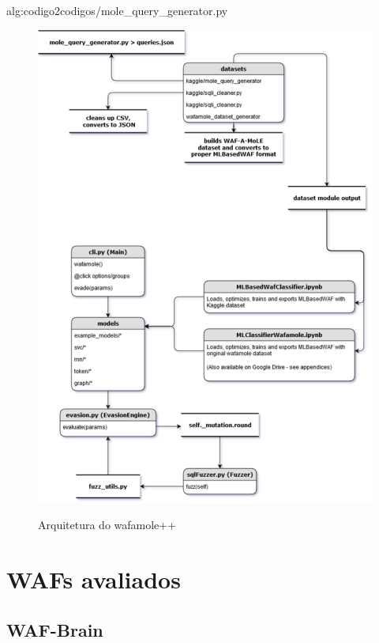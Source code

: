 \label{sec:codigos}
 {alg:codigo2}{codigos/mole_query_generator.py}
\bigskip

\begin{figure}[H]
    \centering
    \caption{Arquitetura do wafamole++}
    \includegraphics[width=16cm]{figuras/wafamole++_architecture.png} 
    \label{fig:internet} 
\end{figure}

\section{WAFs avaliados}

\subsection{WAF-Brain}

